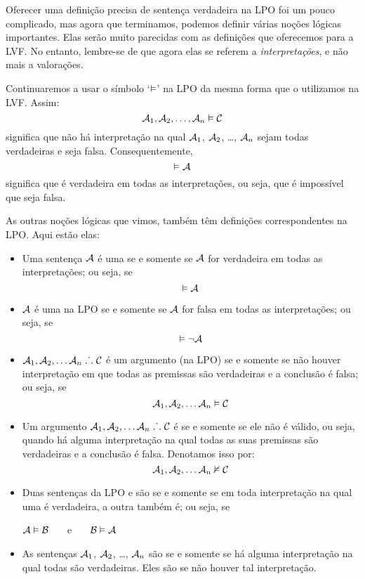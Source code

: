 Oferecer uma definição precisa de sentença verdadeira na LPO foi um pouco complicado, mas agora que terminamos, podemos definir várias noções lógicas importantes.
Elas serão muito parecidas com as definições que oferecemos para a LVF.
No entanto, lembre-se de que agora elas se referem a \emph{interpretações}, e não mais a valorações.

Continuaremos a usar o símbolo `$\vDash$' na LPO da mesma forma que o utilizamos na LVF.
Assim:
	$$\mathcal{A}_1, \mathcal{A}_2, \ldots, \mathcal{A}_n \vDash\mathcal{C}$$
significa que não há interpretação na qual $\mathcal{A}_1$, $\mathcal{A}_2$, \dots, $\mathcal{A}_n$ sejam todas verdadeiras e  seja falsa. Consequentemente,
	$$\vDash\mathcal{A}$$
significa que  é verdadeira em todas as interpretações, ou seja, que é impossível que  seja falsa.

As outras noções lógicas que vimos, também têm definições correspondentes na LPO.
Aqui estão elas:

\begin{itemize}
\item Uma sentença  $\mathcal{A}$ é uma  se e somente se $\mathcal{A}$ for verdadeira em todas as interpretações; ou seja, se
$$\vDash\mathcal{A}$$
\item $\mathcal{A}$ é uma  na LPO se e somente se $\mathcal{A}$ for falsa em todas as interpretações; ou seja, se
$$\vDash\neg\mathcal{A}$$
\item $\mathcal{A}_1, \mathcal{A}_2, \ldots \mathcal{A}_n \mathrel{\ldotp\dot{}\,\ldotp} \mathcal{C}$ é um argumento  (na LPO) se e somente se não houver interpretação em que todas as premissas são verdadeiras e a conclusão é falsa; ou seja, se
$$\mathcal{A}_1,\mathcal{A}_2,\ldots \mathcal{A}_n \vDash\mathcal{C}$$

\item Um argumento $\mathcal{A}_1, \mathcal{A}_2, \ldots \mathcal{A}_n \mathrel{\ldotp\dot{}\,\ldotp} \mathcal{C}$ é  se e somente se ele não é válido, ou seja, quando há alguma interpretação na qual todas as suas premissas são verdadeiras e a conclusão é falsa.
Denotamos isso por:
$$\mathcal{A}_1,\mathcal{A}_2,\ldots \mathcal{A}_n \nvDash\mathcal{C}$$
 
\item Duas sentenças da LPO  e  são  se e somente se em toda interpretação na qual uma é verdadeira, a outra também é; ou seja, se
\begin{center}
	$\mathcal{A}\vDash\mathcal{B}$ \ \ \ e \ \ \ $\mathcal{B}\vDash\mathcal{A}$
\end{center}

\item As sentenças $\mathcal{A}_1$, $\mathcal{A}_2$, \dots, $\mathcal{A}_n$ são  se e somente se há alguma interpretação na qual todas são verdadeiras.
Eles são  se não houver tal interpretação.
\end{itemize}


